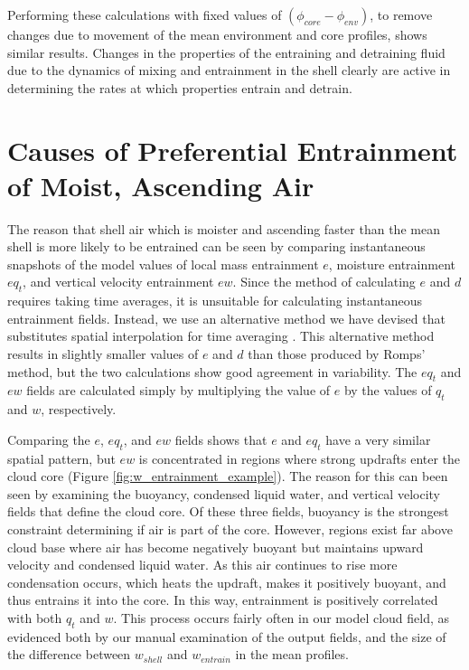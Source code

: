 \documentclass[12pt]{article}
\begin{document}
Performing these calculations with fixed values of 
$(\phi_{core} - \phi_{env})$, to remove changes due to movement of the mean
environment and core profiles, shows similar results.  Changes in the 
properties of the entraining and detraining fluid due to the dynamics of mixing 
and entrainment in the shell clearly are active in determining the rates at 
which properties entrain and detrain.


\section{Causes of Preferential Entrainment of Moist, Ascending Air}

The reason that shell air which is moister and ascending faster than the mean 
shell is more likely to be entrained can be seen by comparing instantaneous 
snapshots of the model values of local mass entrainment $e$, moisture 
entrainment $e{q_t}$, and vertical velocity entrainment $e{w}$.  Since 
the \cite{Romps2010} method of calculating $e$ and $d$ requires taking time 
averages, it is unsuitable for calculating instantaneous entrainment fields.  
Instead, we use an alternative method we have devised that substitutes 
spatial interpolation for time averaging \citep{Dawe2011}.  This alternative 
method results in slightly smaller values of $e$ and $d$ than those produced 
by Romps' method, but the two calculations show good agreement in variability. 
The $eq_t$ and $ew$ fields are calculated simply by multiplying the value of 
$e$ by the values of $q_t$ and $w$, respectively.

Comparing the $e$, $eq_t$, and $ew$ fields shows that $e$ and $eq_t$ have a 
very similar spatial pattern, but $ew$ is concentrated in regions where strong
updrafts enter the cloud core (Figure \ref{fig:w_entrainment_example}).  The
reason for this can been seen by examining the buoyancy, condensed liquid water,
and vertical velocity fields that define the cloud core.  Of these three fields,
buoyancy is the strongest constraint determining if air is part of the core.
However, regions exist far above cloud base where air has become negatively 
buoyant but maintains upward velocity and condensed liquid water.  As this air
continues to rise more condensation occurs, which heats the updraft, makes it
positively buoyant, and thus entrains it into the core.  In this way, 
entrainment is positively correlated with both $q_t$ and $w$.  This process
occurs fairly often in our model cloud field, as evidenced both by our manual
examination of the output fields, and the size of the difference between 
$w_{shell}$ and $w_{entrain}$ in the mean profiles.
\end{document}
